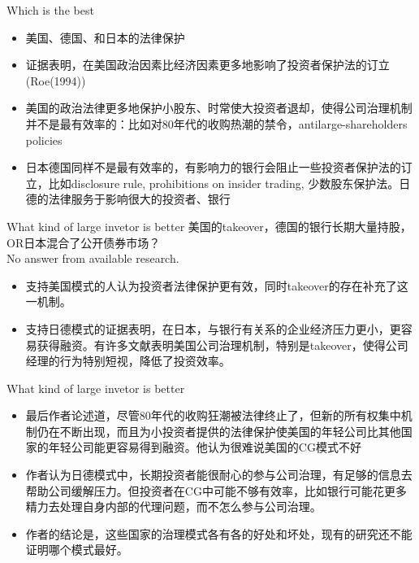\begin{frame}{Which is the best}
	\begin{itemize}
	\item 美国、德国、和日本的法律保护
	\item 证据表明，在美国政治因素比经济因素更多地影响了投资者保护法的订立(Roe(1994))
	\item 美国的政治法律更多地保护小股东、时常使大投资者退却，使得公司治理机制并不是最有效率的：比如对80年代的收购热潮的禁令，antilarge-shareholders policies
	\item 日本德国同样不是最有效率的，有影响力的银行会阻止一些投资者保护法的订立，比如disclosure rule, prohibitions on insider trading, 少数股东保护法。日德的法律服务于影响很大的投资者、银行
	\end{itemize}

\end{frame}

\begin{frame}{What kind of large invetor is better}
	美国的takeover，德国的银行长期大量持股，OR日本混合了公开债券市场？\\
	No answer from available research.
	\begin{itemize}
		\item 支持美国模式的人认为投资者法律保护更有效，同时takeover的存在补充了这一机制。
		\item 支持日德模式的证据表明，在日本，与银行有关系的企业经济压力更小，更容易获得融资。有许多文献表明美国公司治理机制，特别是takeover，使得公司经理的行为特别短视，降低了投资效率。
	\end{itemize}
\end{frame}

\begin{frame}{What kind of large invetor is better}
\begin{itemize}
		\item 最后作者论述道，尽管80年代的收购狂潮被法律终止了，但新的所有权集中机制仍在不断出现，而且为小投资者提供的法律保护使美国的年轻公司比其他国家的年轻公司能更容易得到融资。他认为很难说美国的CG模式不好
		\item 作者认为日德模式中，长期投资者能很耐心的参与公司治理，有足够的信息去帮助公司缓解压力。但投资者在CG中可能不够有效率，比如银行可能花更多精力去处理自身内部的代理问题，而不怎么参与公司治理。
		\item 作者的结论是，这些国家的治理模式各有各的好处和坏处，现有的研究还不能证明哪个模式最好。
	\end{itemize}
\end{frame}



